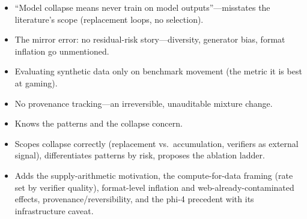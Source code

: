 \begin{interviewq}
\redflags
\begin{itemize}
    \item ``Model collapse means never train on model outputs''---misstates the literature's scope (replacement loops, no selection).
    \item The mirror error: no residual-risk story---diversity, generator bias, format inflation go unmentioned.
    \item Evaluating synthetic data only on benchmark movement (the metric it is best at gaming).
    \item No provenance tracking---an irreversible, unauditable mixture change.
\end{itemize}


\goodgreat
\begin{itemize}
    \item {} Knows the patterns and the collapse concern.
    \item {} Scopes collapse correctly (replacement vs.\ accumulation, verifiers as external signal), differentiates patterns by risk, proposes the ablation ladder.
    \item {} Adds the supply-arithmetic motivation, the compute-for-data framing (rate set by verifier quality), format-level inflation and web-already-contaminated effects, provenance/reversibility, and the phi-4 precedent with its infrastructure caveat.
\end{itemize}

\end{interviewq}

\medskip

